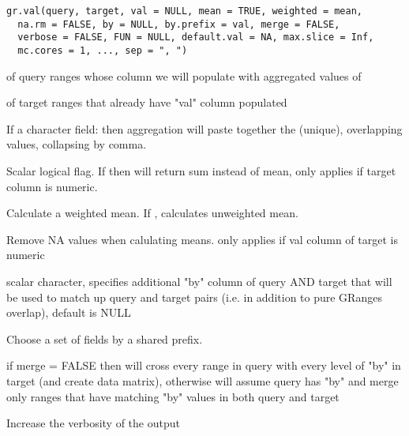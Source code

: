 \documentclass[a4paper]{book}
\begin{document}
%
\begin{Usage}
\begin{verbatim}
gr.val(query, target, val = NULL, mean = TRUE, weighted = mean,
  na.rm = FALSE, by = NULL, by.prefix = val, merge = FALSE,
  verbose = FALSE, FUN = NULL, default.val = NA, max.slice = Inf,
  mc.cores = 1, ..., sep = ", ")
\end{verbatim}
\end{Usage}
%
\begin{Arguments}
\begin{ldescription}
\item[\code{query}]  of query ranges whose  column we will populate with aggregated values of 

\item[\code{target}]  of target ranges that already have "val" column populated

\item[\code{val}] If a character field: then aggregation will paste together the (unique), overlapping values, collapsing by comma. \code{[NULL]}

\item[\code{mean}] Scalar logical flag. If  then will return sum instead of mean, only applies if target  column is numeric.

\item[\code{weighted}] Calculate a weighted mean. If , calculates unweighted mean. \code{[TRUE]}

\item[\code{na.rm}] Remove NA values when calulating means. only applies if val column of target is numeric \code{[FALSE]}

\item[\code{by}] scalar character, specifies additional "by" column of query AND target that will be used to match up query and target pairs (i.e. in addition to pure GRanges overlap), default is NULL

\item[\code{by.prefix}] Choose a set of  fields by a shared prefix.

\item[\code{merge}] if merge = FALSE then will cross every range in query with every level of "by" in target (and create data matrix), otherwise will assume query has "by" and merge only ranges that have matching "by" values in both query and target

\item[\code{verbose}] Increase the verbosity of the output


\end{ldescription}
\end{Arguments}
\end{document}
